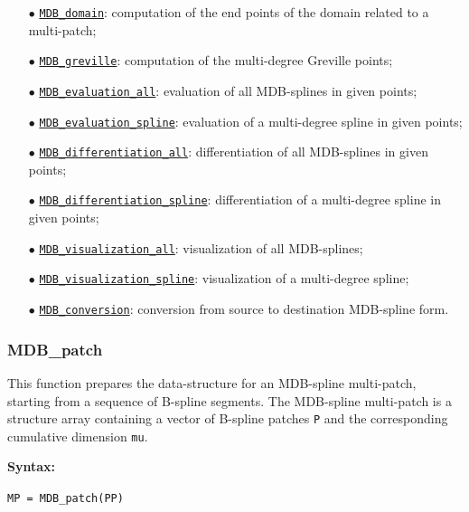 \documentclass[10pt]{./acmtrans2e}
\newcommand{\syntax}[1]{\medskip
\noindent \textbf{Syntax:} \medskip

\texttt{#1}
}
\begin{document}
\begin{itemize}
  \item[$\bullet$] \hyperref[sec:matlab-mdb-domain]{\texttt{MDB\_domain}}: 
    computation of the end points of the domain related to a multi-patch;
  \item[$\bullet$] \hyperref[sec:matlab-mdb-greville]{\texttt{MDB\_greville}}: 
    computation of the multi-degree Greville points;
  \item[$\bullet$] \hyperref[sec:matlab-mdb-evaluation-all]{\texttt{MDB\_evaluation\_all}}: 
    evaluation of all MDB-splines in given points;
  \item[$\bullet$] \hyperref[sec:matlab-mdb-evaluation-spline]{\texttt{MDB\_evaluation\_spline}}: 
    evaluation of a multi-degree spline in given points;
  \item[$\bullet$] \hyperref[sec:matlab-mdb-differentiation-all]{\texttt{MDB\_differentiation\_all}}: 
    differentiation of all MDB-splines in given points;
  \item[$\bullet$] \hyperref[sec:matlab-mdb-differentiation-spline]{\texttt{MDB\_differentiation\_spline}}: 
    differentiation of a multi-degree spline in given points;
  \item[$\bullet$] \hyperref[sec:matlab-mdb-visualization-all]{\texttt{MDB\_visualization\_all}}: 
    visualization of all MDB-splines;
  \item[$\bullet$] \hyperref[sec:matlab-mdb-visualization-spline]{\texttt{MDB\_visualization\_spline}}: 
    visualization of a multi-degree spline;
  \item[$\bullet$] \hyperref[sec:matlab-mdb-conversion]{\texttt{MDB\_conversion}}: 
    conversion from source to destination MDB-spline form.
\end{itemize}


\subsubsection{MDB\_patch} \label{sec:matlab-mdb-patch}

This function prepares the data-structure for an MDB-spline multi-patch, starting from a sequence of B-spline segments. The MDB-spline multi-patch is a structure array containing a vector of B-spline patches \texttt{P} and the corresponding cumulative dimension \texttt{mu}. 

\syntax{MP = MDB\_patch(PP)}
\end{document}
